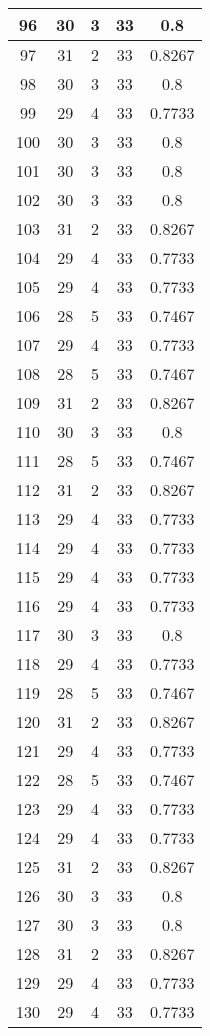 \documentclass[letterpaper, 12pt]{article}
\begin{document}
\begin{longtable}{|c|c|c|c|c|}
\hline
96 & 30 & 3 & 33 & 0.8 \\
\hline
97 & 31 & 2 & 33 & 0.8267 \\
\hline
98 & 30 & 3 & 33 & 0.8 \\
\hline
99 & 29 & 4 & 33 & 0.7733 \\
\hline
100 & 30 & 3 & 33 & 0.8 \\
\hline
101 & 30 & 3 & 33 & 0.8 \\
\hline
102 & 30 & 3 & 33 & 0.8 \\
\hline
103 & 31 & 2 & 33 & 0.8267 \\
\hline
104 & 29 & 4 & 33 & 0.7733 \\
\hline
105 & 29 & 4 & 33 & 0.7733 \\
\hline
106 & 28 & 5 & 33 & 0.7467 \\
\hline
107 & 29 & 4 & 33 & 0.7733 \\
\hline
108 & 28 & 5 & 33 & 0.7467 \\
\hline
109 & 31 & 2 & 33 & 0.8267 \\
\hline
110 & 30 & 3 & 33 & 0.8 \\
\hline
111 & 28 & 5 & 33 & 0.7467 \\
\hline
112 & 31 & 2 & 33 & 0.8267 \\
\hline
113 & 29 & 4 & 33 & 0.7733 \\
\hline
114 & 29 & 4 & 33 & 0.7733 \\
\hline
115 & 29 & 4 & 33 & 0.7733 \\
\hline
116 & 29 & 4 & 33 & 0.7733 \\
\hline
117 & 30 & 3 & 33 & 0.8 \\
\hline
118 & 29 & 4 & 33 & 0.7733 \\
\hline
119 & 28 & 5 & 33 & 0.7467 \\
\hline
120 & 31 & 2 & 33 & 0.8267 \\
\hline
121 & 29 & 4 & 33 & 0.7733 \\
\hline
122 & 28 & 5 & 33 & 0.7467 \\
\hline
123 & 29 & 4 & 33 & 0.7733 \\
\hline
124 & 29 & 4 & 33 & 0.7733 \\
\hline
125 & 31 & 2 & 33 & 0.8267 \\
\hline
126 & 30 & 3 & 33 & 0.8 \\
\hline
127 & 30 & 3 & 33 & 0.8 \\
\hline
128 & 31 & 2 & 33 & 0.8267 \\
\hline
129 & 29 & 4 & 33 & 0.7733 \\
\hline
130 & 29 & 4 & 33 & 0.7733 \\

\end{longtable}
\end{document}
